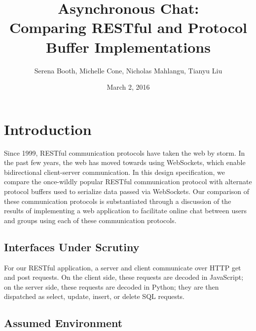 \documentclass[11pt]{article} %
\title{Asynchronous Chat: \\ Comparing RESTful and Protocol Buffer Implementations}
\author{Serena Booth, Michelle Cone, Nicholas Mahlangu, Tianyu Liu}
\date{March 2, 2016} %
\begin{document}
\maketitle


\section{Introduction}

Since 1999, RESTful communication protocols have taken the web by storm. In the past few years, the web has moved towards using WebSockets, which enable bidirectional client-server communication. In this design specification, we compare the once-wildly popular RESTful communication protocol with alternate protocol buffers used to serialize data passed via WebSockets. Our comparison of these communication protocols is substantiated through a discussion of the results of implementing a web application to facilitate online chat between users and groups using each of these communication protocols. 


\subsection{Interfaces Under Scrutiny}

For our RESTful application, a server and client communicate over HTTP get and post requests. On the client side, these requests are decoded in JavaScript; on the server side, these requests are decoded in Python; they are then dispatched as select, update, insert, or delete SQL requests. 

\subsection{Assumed Environment}
\end{document}
